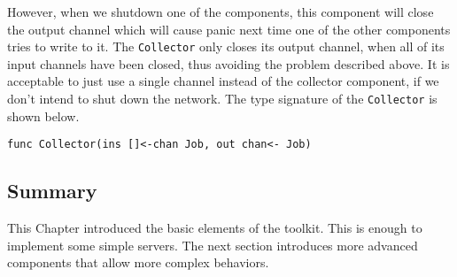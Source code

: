 However, when we shutdown
one of the components, this component will close the output channel
which will cause panic next time one of the other components tries to write
to it. The \texttt{Collector} only closes its output channel, when
all of its input channels have been closed, thus avoiding the problem 
described above. It is acceptable to just use a single channel instead of
the collector component, if we don't intend to shut down the network.
The type signature of the \texttt{Collector} is shown below.
\begin{lstlisting}
func Collector(ins []<-chan Job, out chan<- Job)
\end{lstlisting}


\subsection{Summary}
This Chapter introduced the basic elements of the toolkit. This 
is enough to implement some simple servers. The next section introduces
more advanced components that allow more complex behaviors.

